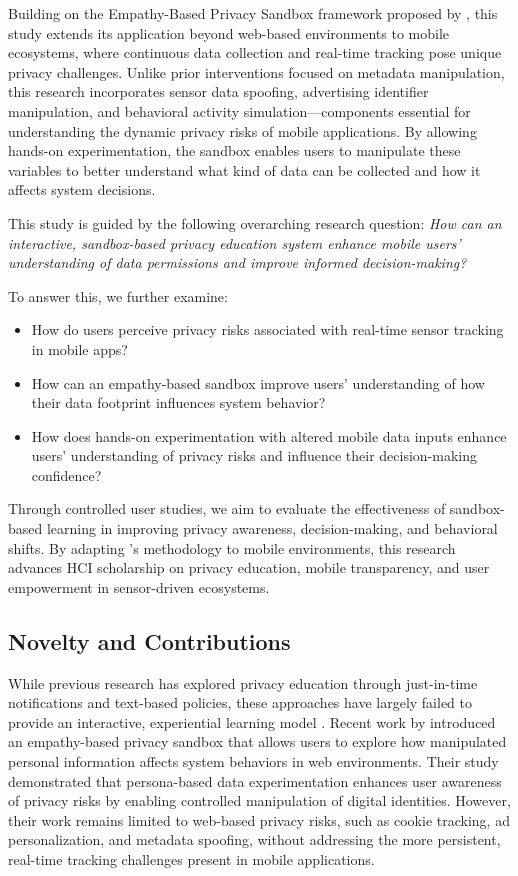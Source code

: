 \documentclass[acmlarge, nonacm]{acmart}
\begin{document}
Building on the Empathy-Based Privacy Sandbox framework proposed by \citet{Chaoran2023EmpathySandbox}, this study extends its application beyond web-based environments to mobile ecosystems, where continuous data collection and real-time tracking pose unique privacy challenges. Unlike prior interventions focused on metadata manipulation, this research incorporates sensor data spoofing, advertising identifier manipulation, and behavioral activity simulation—components essential for understanding the dynamic privacy risks of mobile applications. By allowing hands-on experimentation, the sandbox enables users to manipulate these variables to better understand what kind of data can be collected and how it affects system decisions.

This study is guided by the following overarching research question: \textit{How can an interactive, sandbox-based privacy education system enhance mobile users' understanding of data permissions and improve informed decision-making?}

To answer this, we further examine:
\begin{itemize}
    \item How do users perceive privacy risks associated with real-time sensor tracking in mobile apps?
    \item How can an empathy-based sandbox improve users’ understanding of how their data footprint influences system behavior?
    \item How does hands-on experimentation with altered mobile data inputs enhance users' understanding of privacy risks and influence their decision-making confidence?
\end{itemize}

Through controlled user studies, we aim to evaluate the effectiveness of sandbox-based learning in improving privacy awareness, decision-making, and behavioral shifts. By adapting \citet{Chaoran2023EmpathySandbox}'s methodology to mobile environments, this research advances HCI scholarship on privacy education, mobile transparency, and user empowerment in sensor-driven ecosystems.


\subsection{Novelty and Contributions}

While previous research has explored privacy education through just-in-time notifications and text-based policies, these approaches have largely failed to provide an interactive, experiential learning model \cite{feng2021yaodesign}. Recent work by \citet{Chaoran2023EmpathySandbox} introduced an empathy-based privacy sandbox that allows users to explore how manipulated personal information affects system behaviors in web environments. Their study demonstrated that persona-based data experimentation enhances user awareness of privacy risks by enabling controlled manipulation of digital identities. However, their work remains limited to web-based privacy risks, such as cookie tracking, ad personalization, and metadata spoofing, without addressing the more persistent, real-time tracking challenges present in mobile applications.
\end{document}
